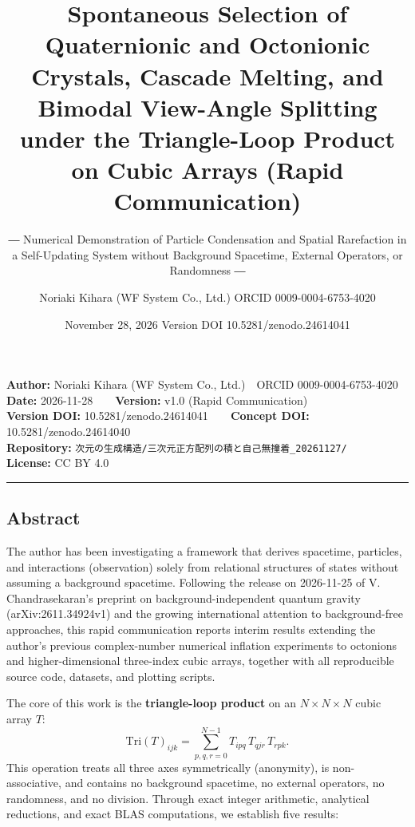 \documentclass[
  a4paper,
]{article}
\title{Spontaneous Selection of Quaternionic and Octonionic Crystals,
Cascade Melting, and Bimodal View-Angle Splitting under the
Triangle-Loop Product on Cubic Arrays (Rapid Communication)}
\subtitle{― Numerical Demonstration of Particle Condensation and Spatial
Rarefaction in a Self-Updating System without Background Spacetime,
External Operators, or Randomness ―}
\author{Noriaki Kihara (WF System Co., Ltd.) ORCID 0009-0004-6753-4020}
\date{November 28, 2026 Version DOI 10.5281/zenodo.24614041}
\begin{document}
\maketitle

\textbf{Author:} Noriaki Kihara (WF System Co., Ltd.)　ORCID
0009-0004-6753-4020\\
\textbf{Date:} 2026-11-28　　\textbf{Version:} v1.0 (Rapid
Communication)\\
\textbf{Version DOI:} 10.5281/zenodo.24614041　　\textbf{Concept DOI:}
10.5281/zenodo.24614040\\
\textbf{Repository:}
\texttt{次元の生成構造/\allowbreak{}三次元正方配列の積と自己無撞着\_\allowbreak{}20261127/\allowbreak{}}\\
\textbf{License:} CC BY 4.0

\begin{center}\rule{0.5\linewidth}{0.5pt}\end{center}

\subsection{Abstract}\label{abstract}

The author has been investigating a framework that derives spacetime,
particles, and interactions (observation) solely from relational
structures of states without assuming a background spacetime. Following
the release on 2026-11-25 of V. Chandrasekaran's preprint on
background-independent quantum gravity (arXiv:2611.34924v1) and the
growing international attention to background-free approaches, this
rapid communication reports interim results extending the author's
previous complex-number numerical inflation experiments to octonions and
higher-dimensional three-index cubic arrays, together with all
reproducible source code, datasets, and plotting scripts.

The core of this work is the \textbf{triangle-loop product} on an
\(N \times N \times N\) cubic array \(T\):
\[\mathrm{Tri}(T)_{ijk} = \sum_{p,q,r=0}^{N-1} T_{ipq}\, T_{qjr}\, T_{rpk}.\]
This operation treats all three axes symmetrically (anonymity), is
non-associative, and contains no background spacetime, no external
operators, no randomness, and no division. Through exact integer
arithmetic, analytical reductions, and exact BLAS computations, we
establish five results:
\end{document}
